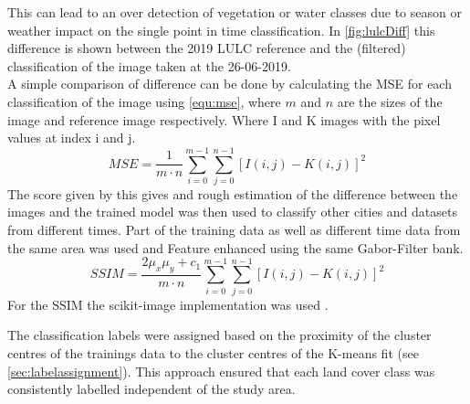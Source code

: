 \documentclass[12pt,a4paper, english,twoside]{scrartcl}
\begin{document}
      This can lead to an over detection of vegetation or water classes due to season or weather impact on the single point in time classification.
      In \cref{fig:lulcDiff} this difference is shown between the 2019 \gls{LULC} reference and the (filtered) classification of the image taken at the 26-06-2019. \\ 
      A simple comparison of difference can be done by calculating the \gls{MSE} for each classification of the image using \cref{equ:mse}, where  $m$ and $n$ are the sizes of the image and reference image respectively. Where I and K images with the pixel values at index i and j. 
      \begin{equation}\label{equ:mse}
        MSE = \frac{1}{m\cdot n}\sum_{i=0}^{m-1} \sum_{j=0}^{n-1} \left[I(i,j)-K(i,j)\right]^2
      \end{equation}
      The score given by this gives and rough estimation of the difference between the images and the trained model was then used to classify other cities and datasets from different times. 
      Part of the training data as well as different time data from the same area was used and Feature enhanced using the same Gabor-Filter bank.
      \begin{equation}\label{equ:ssim}
        SSIM = \frac{2\mu_x\mu_y+c_1}{m\cdot n}\sum_{i=0}^{m-1} \sum_{j=0}^{n-1} \left[I(i,j)-K(i,j)\right]^2
      \end{equation}
      For the SSIM the scikit-image implementation was used \autocite{Walt2014}.



      \noindent
      The classification labels were assigned based on the proximity of the cluster centres of the trainings data to the cluster centres of the K-means fit (see \cref{sec:labelassignment}).
      This approach ensured that each land cover class was consistently labelled independent of the study area.\\
\end{document}
